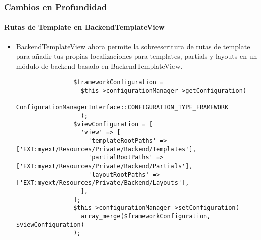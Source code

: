 \begin{frame}[fragile]
	\frametitle{Cambios en Profundidad}
	\framesubtitle{Rutas de Template en BackendTemplateView}

	\lstset{basicstyle=\tiny\ttfamily}

	\begin{itemize}
		\item BackendTemplateView ahora permite la sobreescritura de rutas de template para añadir tus propias localizaciones para templates,
			partials y layouts en un módulo de backend basado en BackendTemplateView.

			\begin{lstlisting}
				$frameworkConfiguration =
				  $this->configurationManager->getConfiguration(
				    ConfigurationManagerInterface::CONFIGURATION_TYPE_FRAMEWORK
				  );
				$viewConfiguration = [
				  'view' => [
				    'templateRootPaths' => ['EXT:myext/Resources/Private/Backend/Templates'],
				    'partialRootPaths' => ['EXT:myext/Resources/Private/Backend/Partials'],
				    'layoutRootPaths' => ['EXT:myext/Resources/Private/Backend/Layouts'],
				  ],
				];
				$this->configurationManager->setConfiguration(
				  array_merge($frameworkConfiguration, $viewConfiguration)
				);
			\end{lstlisting}

	\end{itemize}

\end{frame}


